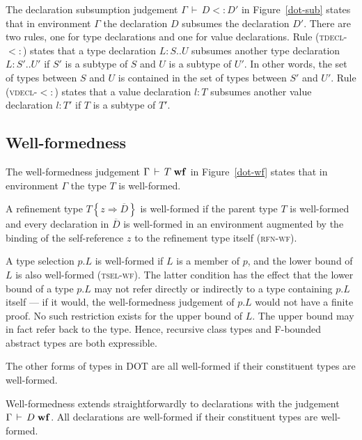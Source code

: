 \documentclass{llncs}
\renewcommand{\ts}{\,\vdash\,}
\newcommand{\sub}{<:}
\newcommand{\wf}{\;\mbox{\textbf{wf}}}
\newcommand{\sing}{.\textbf{type}}
\newcommand{\refine}[2]{\left\{#1 \Rightarrow #2 \right\}}
\newcommand{\seq}[1]{\overline{#1}}
\newcommand{\Ldecl}[3]{#1 : #2..#3}%
\newcommand{\ldecl}[2]{#1 : #2}
\begin{document}
The declaration subsumption judgement $\Gamma \ts D \sub D'$ in Figure~\ref{dot-sub}
states that in environment $\Gamma$
the declaration $D$ subsumes the declaration $D'$. There are two
rules, one for type declarations and one for value declarations. 
Rule (\textsc{tdecl-$\sub$})
states that a type declaration $\Ldecl L S U$ subsumes another type declaration $\Ldecl L {S'} {U'}$
if $S'$ is a subtype of $S$ and $U$ is a subtype of $U'$. In other words, the set of types
between $S$ and $U$ is contained in the set of types between $S'$ and $U'$.
Rule (\textsc{vdecl-$\sub$})
states that a value declaration $\ldecl l T$ subsumes another value declaration $\ldecl l T'$
if $T$ is a subtype of $T'$.


\subsection*{Well-formedness}

The well-formedness judgement $\Gamma \ts T \wf$ in Figure~\ref{dot-wf}
states that in environment $\Gamma$ the type $T$ is well-formed.


A refinement type $T \refine z {\seq D}$ is
well-formed if the parent type $T$ is well-formed and every
declaration in $\seq D$ is well-formed in an environment augmented by
the binding of the self-reference $z$ to the refinement type itself
(\textsc{rfn-wf}).

A type selection $p.L$ is
well-formed if $L$ is a member of $p$, and the lower bound of $L$
is also well-formed (\textsc{tsel-wf}). The latter condition
has the effect that the lower bound of a type $p.L$ may not
refer directly or indirectly to a type containing $p.L$ itself
--- if it would, the well-formedness judgement of $p.L$ would
not have a finite proof. No such restriction exists for the upper
bound of $L$. The upper bound may in fact refer back to the
type. Hence, recursive class types and F-bounded abstract types are
both expressible. 

The other forms of types in DOT are all well-formed if their
constituent types are well-formed.

Well-formedness extends straightforwardly to
declarations with the judgement $\Gamma \ts D \wf$. All declarations are well-formed if their constituent types
are well-formed.
\end{document}
